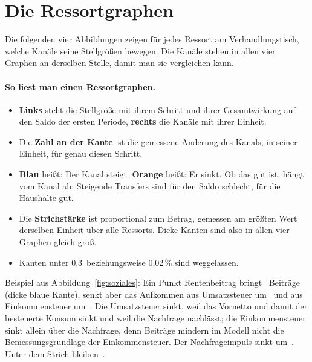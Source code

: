 \section{Die Ressortgraphen}
\label{sec:ressortgraphen}

Die folgenden vier Abbildungen zeigen für jedes Ressort am Verhandlungstisch, welche Kanäle
seine Stellgrößen bewegen. Die Kanäle stehen in allen vier Graphen an derselben Stelle,
damit man sie vergleichen kann.

\paragraph{So liest man einen Ressortgraphen.}
\begin{itemize}
\item \textbf{Links} steht die Stellgröße mit ihrem Schritt und ihrer Gesamtwirkung auf den
  Saldo der ersten Periode, \textbf{rechts} die Kanäle mit ihrer Einheit.
\item Die \textbf{Zahl an der Kante} ist die gemessene Änderung des Kanals, in seiner
  Einheit, für genau diesen Schritt.
\item \textbf{Blau} heißt: Der Kanal steigt. \textbf{Orange} heißt: Er sinkt. Ob das gut ist,
  hängt vom Kanal ab: Steigende Transfers sind für den Saldo schlecht, für die Haushalte gut.
\item Die \textbf{Strichstärke} ist proportional zum Betrag, gemessen am größten Wert
  derselben Einheit über alle Ressorts. Dicke Kanten sind also in allen vier Graphen gleich
  groß.
\item Kanten unter 0,3\,\Mrd{} beziehungsweise 0,02\,\% sind weggelassen.
\end{itemize}
Beispiel aus Abbildung~\ref{fig:soziales}: Ein Punkt Rentenbeitrag bringt
\,\Mrd{} Beiträge (dicke blaue Kante), senkt aber das Aufkommen aus
Umsatzsteuer um \,\Mrd{} und aus Einkommensteuer um
\,\Mrd. Die Umsatzsteuer sinkt, weil das Vornetto und damit der
besteuerte Konsum sinkt und weil die Nachfrage nachlässt; die Einkommensteuer sinkt allein
über die Nachfrage, denn Beiträge mindern im Modell nicht die Bemessungsgrundlage der
Einkommensteuer.
Der Nachfrageimpuls sinkt um \,\Mrd. Unter dem Strich bleiben
\,\Mrd.

\newcommand{\ressortgraph}[3]{%
\begin{figure}[p]
\centering
\begin{tikzpicture}

\end{tikzpicture}
\caption{#2}
\label{#3}
\end{figure}}

